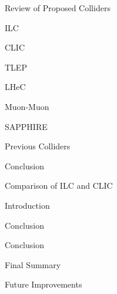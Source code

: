 \documentclass[12pt]{article}
\begin{document}
 \begin{section}{Review of Proposed Colliders}
     \begin{subsection}{ILC}
         
     \end{subsection}
     \begin{subsection}{CLIC}
         
     \end{subsection}
     \begin{subsection}{TLEP}
         
     \end{subsection}
     \begin{subsection}{LHeC}
         
     \end{subsection}
     \begin{subsection}{Muon-Muon}
         
     \end{subsection}
     \begin{subsection}{SAPPHIRE}
             
     \end{subsection}
     \begin{subsection}{Previous Colliders}
             
     \end{subsection}
          
     \begin{subsection}{Conclusion}
     \end{subsection}

 \end{section}
 
 \begin{section}{Comparison of ILC and CLIC}
 
     \begin{subsection}{Introduction}
         
     \end{subsection}
     
     
     
     \begin{subsection}{Conclusion}
         
     \end{subsection}
     
 \end{section}
 
 \begin{section}{Conclusion}
 
     \begin{subsection}{Final Summary}
         
     \end{subsection}
     \begin{subsection}{Future Improvements}
         
     \end{subsection}
 
 \end{section}
 
 \clearpage
 \printbibliography
 
\end{document}
